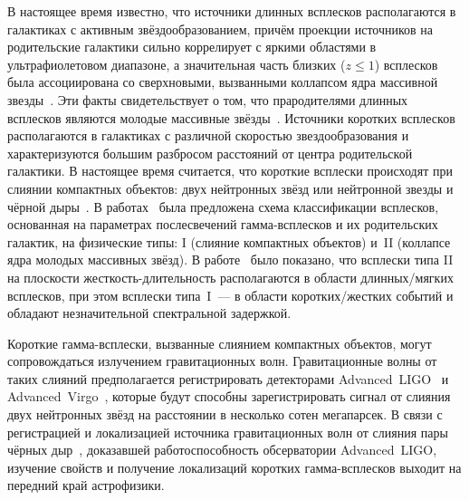 В настоящее время известно, что источники длинных всплесков располагаются в галактиках 
с активным звёздообразованием, причём проекции источников на родительские галактики сильно
коррелирует с яркими областями в ультрафиолетовом диапазоне, а значительная часть 
близких ($z \le 1$) всплесков была ассоциирована со сверхновыми, вызванными 
коллапсом ядра массивной звезды~\citep{Hjorth_and_Bloom_2012in_book}.
Эти факты свидетельствует о том, что прародителями длинных всплесков являются молодые 
массивные звёзды~\citep[см. обзор][]{Berger_2014ARAA}.
Источники коротких всплесков располагаются в галактиках с различной скоростью 
звездообразования и характеризуются большим разбросом расстояний от центра родительской галактики. 
В настоящее время считается, что короткие всплески происходят при слиянии компактных 
объектов: двух нейтронных звёзд или нейтронной звезды и чёрной дыры~\citep{Berger_2014ARAA}.
В работах~\citep{Zhang_2006, Zhang_2007, Zhang_2009} была предложена схема классификации всплесков, 
основанная на параметрах послесвечений гамма-всплесков и их родительских галактик,
на физические типы: I (слияние компактных объектов) и~II (коллапсе ядра молодых массивных звёзд). 
В работе~\citep{Zhang_2009} было показано, 
что всплески типа II на плоскости жесткость-длительность располагаются в области 
длинных/мягких всплесков, при этом всплески типа~I~--- в области коротких/жестких 
событий и обладают незначительной спектральной задержкой.

Короткие гамма-всплески, вызванные слиянием компактных объектов, могут сопровождаться излучением гравитационных волн. 
Гравитационные волны от таких слияний предполагается регистрировать 
детекторами Advanced~LIGO~\citep{LIGO_2015CQGra} и Advanced~Virgo~\citep{Acernese_2015CQGra}, 
которые будут способны зарегистрировать сигнал от слияния
двух нейтронных звёзд на расстоянии в несколько сотен мегапарсек. 
В связи с регистрацией и локализацией источника гравитационных
волн от слияния пары чёрных дыр~\citep{Abbott_2016PhRvL}, доказавшей работоспособность обсерватории 
Advanced~LIGO, изучение свойств и получение локализаций коротких гамма-всплесков 
выходит на передний край астрофизики.

